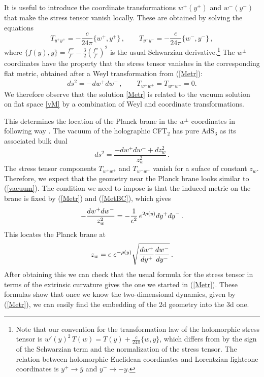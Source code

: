 \documentclass[11pt]{article}
\newcommand{\be}{\begin{equation}}
\newcommand{\ee}{\end{equation}}
\def\la{\label}
\def\nref#1{(\ref{#1})}
\begin{document}
It is useful to introduce the coordinate transformations $w^+(y^+)$ and $w^-(y^-)$ that make the stress tensor vanish locally.
These are obtained by solving the equations    
\be
 T_{y^+ y^+} = - { \frac{c}{24\pi} } \{ w^+ , y^+ \} \, ,
 \qquad T_{y^- y^-} = - { \frac{c}{24\pi} } \{ w^- , y^- \}
\, ,
\la{Coorwy}
\ee
where $\{f(y),y\} = \frac{f'''}{f'} - \frac{3}{2} \left(\frac{f''}{f'}\right)^2$ is the usual Schwarzian derivative.\footnote{Note that our convention for the transformation law of the holomorphic stress tensor is $w'(y)^2\, T(w) = T(y) + \frac{c}{24\pi}\{w,y\}$, which differs from \cite{Polchinski:1998rq} by the sign of the Schwarzian term and the normalization of the stress tensor. 
The relation between holomorphic Euclidean coordinates and Lorentzian lightcone coordinates is $y^+ \to \overline{y}$ and $y^- \to -y$.}
The $w^\pm$ coordinates have the property that the stress tensor vanishes in the corresponding flat metric, obtained after a Weyl transformation from (\ref{Metr}):
\begin{align}
ds^2 = - dw^+ dw^-\, , \qquad T_{w^+ w^+} = T_{w^- w^-} = 0. \label{vM}
\end{align}
We therefore observe that the solution \eqref{Metr} is related to the vacuum solution on flat space \eqref{vM} by a combination of Weyl and coordinate transformations.

This determines the location of the Planck brane in the $w^\pm$ coordinates in following way \cite{Banados:1998gg}. 
The vacuum of the holographic CFT$_2$ has pure AdS$_3$ as its associated bulk dual
\be 
\la{vacuum}
ds^2 = \frac{ -dw^+ dw^- + dz_w^2}{z_w^2} \, .
\ee
The stress tensor components $T_{w^+w^+}$ and $T_{w^-w^-}$ vanish for a suface of constant $z_w$.
Therefore, we expect that the geometry near the Planck brane looks similar to (\ref{vacuum}).
The condition we need to impose is that the induced metric on the brane is fixed by (\ref{Metr}) and (\ref{MetBC}), which gives
\begin{align}
- {dw^+ dw^- \over z_w^2}  = - \frac{1}{\epsilon^2} \, e^{2 \rho(y)} dy^+ dy^- \,.
\end{align}
This locates the Planck brane at 
\begin{align}
z_w  = \epsilon \ e^{-\rho(y)} \sqrt{{dw^+ \over dy^+} {dw^- \over dy^-}}\, .
\label{PlanckBr}
\end{align}
After obtaining this we can check that the usual formula for the stress tensor in terms of the extrinsic curvature \cite{Balasubramanian:1999re} gives the one we started in \nref{Metr}. 
These formulas show that once we know the two-dimensional dynamics, given by \nref{Metr}, we can easily find the embedding of the 2d geometry into the 3d one.
\end{document}
